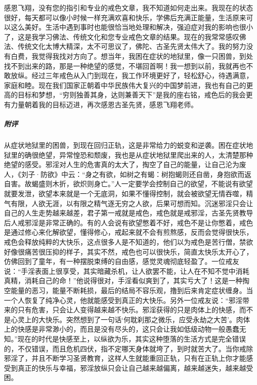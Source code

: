 \begin{case}
    感恩飞翔，没有您的指引和专业的戒色文章，我不知道如何走出来。我现在的状态很好，每天都可以像小时候一样充满欢喜和快乐，学佛后充满正能量，生活原来可以这么美好。生活中遇到事时也能很恰当地处理和解决，强迫症对我的影响也很小了，这是我学习佛法、传统文化和您专业戒色文章的结果。现在的我常常感叹佛法、传统文化太博大精深，太不可思议了，佛陀、古圣先贤太伟大了。我的努力没有白费，我觉得我找对方向了。想当年，我困在症状的地狱里，像一只困兽，到处找不到出来的路，那是一种绝望的感觉，不堪回首啊！我一想到以前，我就再也不敢放纵。经过三年戒色从入门到现在，我工作环境更好了，轻松舒心，待遇满意，家庭和睦。现在我们国家正朝着中华民族伟大复兴的中国梦前进，我也有自己的更高的目标和梦想，“穷则独善其身，达则兼善天下”是我的座右铭，戒色后的我会更有力量朝着我的目标迈进，再次感恩古圣先贤，感恩飞翔老师。
    \subparagraph{附评} 从症状地狱里的困兽，到现在回归正轨，这是非常给力的蜕变和逆袭。困在症状地狱里的确很绝望，异常惶恐和颓废，我也是从症状地狱里爬出来的人，太清楚那种绝望的感受。邪淫对人生的危害真的太大了，掏空了自己的能量，让自己沦为废人，《刘子·防欲》中云：“身之有欲，如树之有蝎：树抱蝎则还自凿，身抱欲而返自害。故蝎盛则木折，欲炽则身亡。”人一定要学会控制自己的欲望，不能说有欲望就要发泄，欲望本来就是一个无底洞，如果不懂得控制，就会被欲望无情吞噬，精气有限，人欲无涯，以有限之精气逐无穷之人欲，后果可想而知。沉迷邪淫只会让自己的人生走势越来越差，君子第一戒就是戒色，戒色就是戒邪淫，古圣先贤教导后人戒邪淫是非常正确的。有的人会说有欲望憋着不好，戒色不是让你憋着，戒色是通过修心来化解欲望，懂得修心，戒起来就不会有煎熬感，反而会觉得很快乐，戒色会释放纯粹的大快乐，这点很多人是不知道的，他们以为戒色是苦行僧，禁欲好像很痛苦很压抑的样子，其实不然，戒色也可以很快乐，简直太快乐太开心了，仿佛回到了童年，有一种摆脱束缚的自由感，感觉灵魂彻底轻盈了。一位戒友说：“手淫表面上很享受，其实暗藏杀机，让人欲罢不能，让人在不知不觉中消耗真精，消耗自己的命！”他说得很对，手淫看似爽到了，其实亏大了！这是一种掏空能量的恶习，能量不断耗损，最后的结局不容乐观，撸到后来肯定症状缠身。当一个人恢复了纯净心灵，他就能感受到真正的大快乐。另外一位戒友说：“邪淫带来的只有危害，只会让人变得越来越不快乐。邪淫获得的只是肉体上的快感，而不是心灵上的大快乐。突然想到了一句话‘何耽刹那之微乐，应受永劫之大苦’。肉体上的快感是非常渺小的，而且是没有尽头的，这只会让我如低级动物一般愚蠢无知。”现在的时代是快感至上，以纵欲为乐，其实这种堕落的生活方式是完全错误的，不仅错误，而且危机四伏，指不定哪天身体就垮了，到时就苦大了。当你戒除邪淫了，并且不断学习圣贤教育，这样人生就能重回正轨，只有在正轨上你才能感受到真正的快乐与幸福，邪淫放纵只会让自己越来越偏离，越来越迷失，越来越受困。
\end{case}

